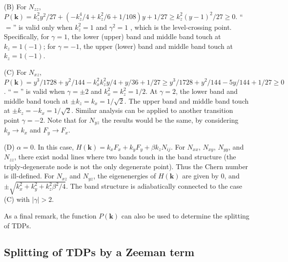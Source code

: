 \documentclass[aps,prl,floatfix,twocolumn,reprint]{revtex4}
\begin{document}
(B) For $N_{zz}$, $P(\bm k)=k_z^2y^2/27+(-k_z^4/4+k_z^2/6+1/108)y+1/27\geq
k_z^2(y-1)^2/27\geq 0$. ``$=$'' is valid only when $k_z^2=1$ and $\gamma^2=1$%
, which is the level-crossing point. Specifically, for $\gamma=1$, the lower
(upper) band and middle band touch at $k_z=1 (-1)$; for $\gamma=-1$, the
upper (lower) band and middle band touch at $k_z=1 (-1)$.

(C) For $N_{xz}$, $P(\bm k)=y^3/1728+y^2/144-k_x^2k_z^2 y/4+y/36+1/27\geq
y^3/1728+y^2/144-5y/144+1/27\geq 0$. ``$=$'' is valid when $\gamma=\pm2$ and
$k_x^2=k_z^2=1/2$. At $\gamma=2$, the lower band and middle band touch at $%
\pm k_z=k_x=1/\sqrt{2}$. The upper band and middle band touch at $\pm
k_z=-k_x=1/\sqrt{2}$. Similar analysis can be applied to another transition
point $\gamma=-2$. Note that for $N_{yz}$ the results would be the same, 
by considering $k_y\rightarrow k_x$ and $F_y\rightarrow F_x$.

(D) $\alpha=0$. In this case, $H(\bm k)=k_x F_x+k_y F_y+\beta k_z N_{ij}$. For $N_{xx}$, $N_{xy}$, $N_{yy}$, and $N_{zz}$, there
exist nodal lines where two bands touch in the band structure (the triply-degenerate node is not
the only degenerate point). Thus the Chern number is
ill-defined. For $N_{xz}$ and $N_{yz}$, the eigenenergies of $H(\bm k)$ are given by $0$, and $%
\pm\sqrt{k_x^2+k_y^2+k_z^2\beta^2/4}$. The band structure is adiabatically connected to
the case (C) with $|\gamma|>2$.

As a final remark, the function $P(\bm k)$ can also be used to determine the
splitting of TDPs.

\subsection{Splitting of TDPs by a Zeeman term}
\end{document}
